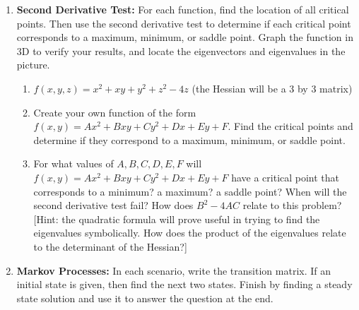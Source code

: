\begin{enumerate}
\item {\bf Second Derivative Test:} \label{seconddertest}For each function, find the location of all critical points. Then use the second derivative test to determine if each critical point corresponds to a maximum, minimum, or saddle point. Graph the function in 3D to verify your results, and locate the eigenvectors and eigenvalues in the picture.
\begin{enumerate}
\item $f(x,y,z)=x^2+xy+y^2+z^2-4z$ (the Hessian will be a 3 by 3 matrix)
\item Create your own function of the form $f(x,y)=Ax^2+Bxy+Cy^2+Dx+Ey+F$.  Find the critical points and determine if they correspond to a maximum, minimum, or saddle point. 
\item For what values of $A,B,C,D,E,F$ will $f(x,y)=Ax^2+Bxy+Cy^2+Dx+Ey+F$ have a critical point that corresponds to a minimum? a maximum? a saddle point? When will the second derivative test fail? How does $B^2-4AC$ relate to this problem? [Hint: the quadratic formula will prove useful in trying to find the eigenvalues symbolically.  How does the product of the eigenvalues relate to the determinant of the Hessian?]
\end{enumerate}







\item  {\bf Markov Processes:}\label{stochastic} In each scenario, write the transition matrix. If an initial state is given, then find the next two states. Finish by finding a steady state solution and use it to answer the question at the end.
\begin{enumerate}


\end{enumerate}
\end{enumerate}
